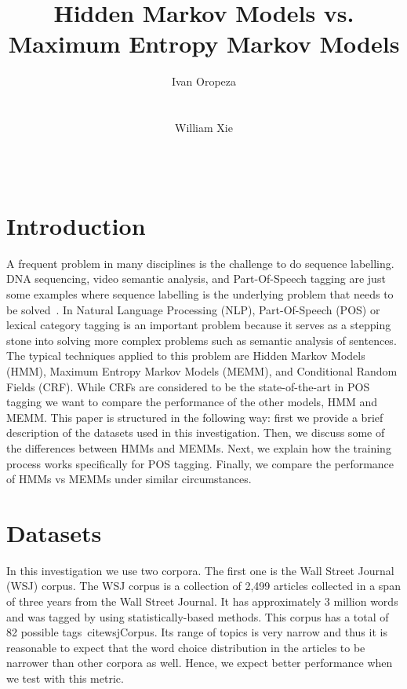 \documentclass{acm_proc_article-sp}
\begin{document}
\author{
\alignauthor
Ivan Oropeza\\
       \\
       \\
\alignauthor
William Xie\\
       \\
       \\
}

\title{Hidden Markov Models vs. Maximum Entropy Markov Models}


\maketitle
\section{Introduction}
A frequent problem in many disciplines is the challenge to do sequence labelling. DNA sequencing, video semantic analysis, and Part-Of-Speech tagging are just some examples where sequence labelling is the underlying problem that needs to be solved~\cite{dnaEx, videoEx, nlpEx}. In Natural Language Processing (NLP), Part-Of-Speech (POS) or lexical category tagging is an important problem because it serves as a stepping stone into solving more complex problems such as semantic analysis of sentences. The typical techniques applied to this problem are Hidden Markov Models (HMM), Maximum Entropy Markov Models (MEMM), and Conditional Random Fields (CRF). While CRFs are considered to be the state-of-the-art in POS tagging we want to compare the performance of the other models, HMM and MEMM. This paper is structured in the following way: first we provide a brief description of the datasets used in this investigation. Then, we discuss some of the differences between HMMs and MEMMs. Next, we explain how the training process works specifically for POS tagging. Finally, we compare the performance of HMMs vs MEMMs under similar circumstances.

\section{Datasets}
In this investigation we use two corpora. The first one is the Wall Street Journal (WSJ) corpus. The WSJ corpus is a collection of 2,499 articles collected in a span of three years from the Wall Street Journal. It has approximately 3 million words and was tagged by using statistically-based methods. This corpus has a total of 82 possible tags~cite{wsjCorpus}. Its range of topics is very narrow and thus it is reasonable to expect that the word choice distribution in the articles to be narrower than other corpora as well. Hence, we expect better performance when we test with this metric.
\end{document}
